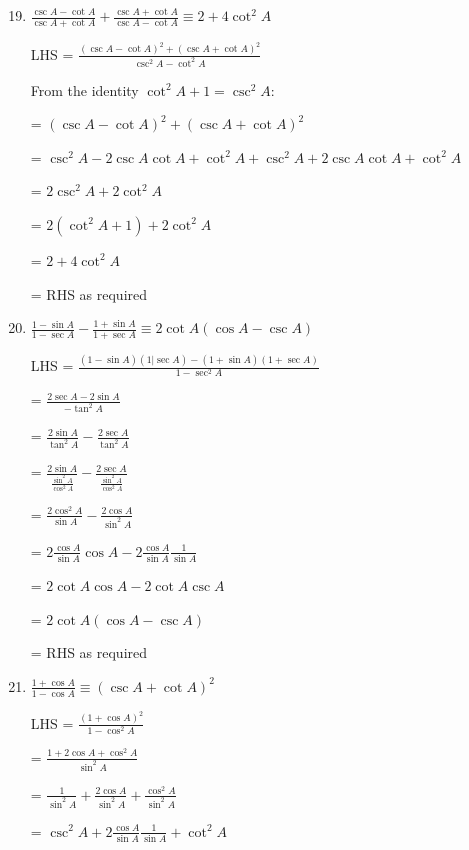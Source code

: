 \documentclass[../main.tex]{subfiles}
\begin{document}
\begin{enumerate}
    \setcounter{enumi}{18}
    \item $\frac{\csc{A}-\cot{A}}{\csc{A}+\cot{A}}+\frac{\csc{A}+\cot{A}}{\csc{A}-\cot{A}}\equiv 2+4\cot^2{A}$
    
    LHS = $\frac{(\csc{A}-\cot{A})^2+(\csc{A}+\cot{A})^2}{\csc^2{A}-\cot^2{A}}$

    From the identity $\cot^2{A}+1=\csc^2{A}$:

    = $(\csc{A}-\cot{A})^2+(\csc{A}+\cot{A})^2$

    = $\csc^2{A}-2\csc{A}\cot{A}+\cot^2{A}+\csc^2{A}+2\csc{A}\cot{A}+\cot^2{A}$

    = $2\csc^2{A}+2\cot^2{A}$

    = $2(\cot^2{A}+1)+2\cot^2{A}$

    = $2 + 4\cot^2{A}$

    = RHS as required

    \item $\frac{1-\sin{A}}{1-\sec{A}}-\frac{1+\sin{A}}{1+\sec{A}}\equiv 2\cot{A}(\cos{A}-\csc{A})$
    
    LHS = $\frac{(1-\sin{A})(1|\sec{A})-(1+\sin{A})(1+\sec{A})}{1-\sec^2{A}}$

    = $\frac{2\sec{A}-2\sin{A}}{-\tan^2{A}}$

    = $\frac{2\sin{A}}{\tan^2{A}}-\frac{2\sec{A}}{\tan^2{A}}$

    = $\frac{2\sin{A}}{\frac{\sin^2{A}}{\cos^2{A}}}-\frac{2\sec{A}}{\frac{\sin^2{A}}{\cos^2{A}}}$

    = $\frac{2\cos^2{A}}{\sin{A}}-\frac{2\cos{A}}{\sin^2{A}}$

    = $2\frac{\cos{A}}{\sin{A}}\cos{A}-2\frac{\cos{A}}{\sin{A}}\frac{1}{\sin{A}}$

    = $2\cot{A}\cos{A}-2\cot{A}\csc{A}$

    = $2\cot{A}(\cos{A}-\csc{A})$

    = RHS as required

    \item $\frac{1+\cos{A}}{1-\cos{A}}\equiv (\csc{A}+\cot{A})^2$
    
    LHS = $\frac{(1+\cos{A})^2}{1-\cos^2{A}}$

    = $\frac{1+2\cos{A}+\cos^2{A}}{\sin^2{A}}$

    = $\frac{1}{\sin^2{A}}+\frac{2\cos{A}}{\sin^2{A}}+\frac{\cos^2{A}}{\sin^2{A}}$

    = $\csc^2{A}+2\frac{\cos{A}}{\sin{A}}\frac{1}{\sin{A}}+\cot^2{A}$


\end{enumerate}
\end{document}
